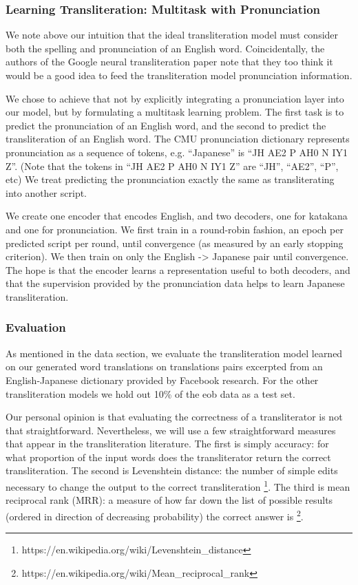 \documentclass{article}
\begin{document}
\subsubsection*{Learning Transliteration: Multitask with Pronunciation}

We note above our intuition that the ideal transliteration model
must consider both the spelling and pronunciation of an English word.
Coincidentally,
the authors of the Google neural transliteration paper
\cite{Rosca2016SequencetosequenceNN}
note that they too think it would be a good idea
to feed the transliteration model pronunciation information.

We chose to achieve that not by
explicitly integrating a pronunciation layer into our model,
but by formulating a multitask learning problem.
The first task is to predict the pronunciation of an English word,
and the second to predict the transliteration of an English word.
The CMU pronunciation dictionary represents pronunciation
as a sequence of tokens,
e.g. ``Japanese'' is ``JH AE2 P AH0 N IY1 Z''.
(Note that the tokens in ``JH AE2 P AH0 N IY1 Z''
are ``JH'', ``AE2'', ``P'', etc)
We treat predicting the pronunciation exactly the same as
transliterating into another script.

We create one encoder that encodes English,
and two decoders, one for katakana and one for pronunciation.
We first train in a round-robin fashion,
an epoch per predicted script per round,
until convergence (as measured by an early stopping criterion).
We then train on only the English -> Japanese pair
until convergence.
The hope is that the encoder learns a representation useful to both decoders,
and that the supervision provided by the pronunciation data
helps to learn Japanese transliteration.

\subsubsection*{Evaluation}

As mentioned in the data section,
we evaluate the transliteration model learned on our generated word translations
on translations pairs excerpted from an English-Japanese dictionary
provided by Facebook research.
For the other transliteration models
we hold out 10\% of the eob data as a test set.

Our personal opinion is that evaluating the correctness
of a transliterator is not that straightforward.
Nevertheless,
we will use a few straightforward measures
that appear in the transliteration literature.
The first is simply accuracy:
for what proportion of the input words
does the transliterator return the correct transliteration.
The second is Levenshtein distance:
the number of simple edits necessary to change the output to
the correct transliteration
\footnote{https://en.wikipedia.org/wiki/Levenshtein\_distance}.
The third is mean reciprocal rank (MRR):
a measure of how far down the list of possible results
(ordered in direction of decreasing probability)
the correct answer is
\footnote{https://en.wikipedia.org/wiki/Mean\_reciprocal\_rank}.
\end{document}
